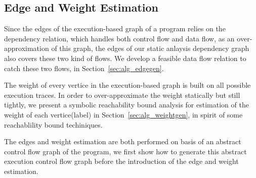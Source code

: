
\subsection{Edge and Weight Estimation}
\label{sec:alg_weightedgegen}

Since the edges of the execution-based graph of a program relies on the dependency relation, which handles both control flow and data flow, as an over-approximation of this graph, the edges of our static anlaysis dependency graph also covers these two kind of flows. We develop a feasible data flow relation to catch these two flows, in Section~\ref{sec:alg_edgegen}.


The weight of every vertice in the execution-based graph is built on all possible execution traces.
In order to over-approximate the weight statically but still tightly, we present a symbolic reachability bound analysis for estimation of the weight of each vertice(label) in Section~\ref{sec:alg_weightgen},
in spirit of some reachablility bound techiniques.


The edges and weight estimation are both performed on basis of an abstract control flow graph of the program, we first show how to generate this abstract execution control flow graph before the introduction of  the edge and weight estimation.  

